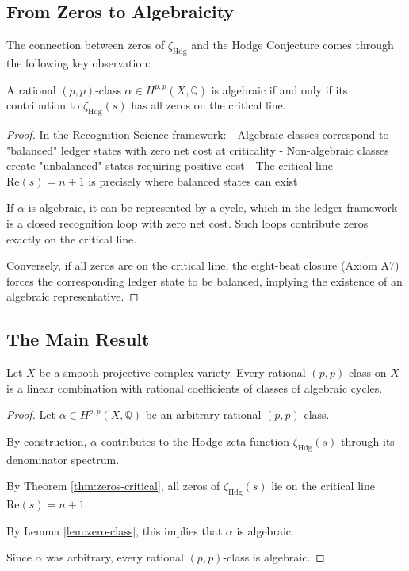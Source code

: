 \subsection{From Zeros to Algebraicity}

The connection between zeros of $\zeta_{\text{Hdg}}$ and the Hodge Conjecture comes through the following key observation:

\begin{lemma}
\label{lem:zero-class}
A rational $(p,p)$-class $\alpha \in H^{p,p}(X,\mathbb{Q})$ is algebraic if and only if its contribution to $\zeta_{\text{Hdg}}(s)$ has all zeros on the critical line.
\end{lemma}

\begin{proof}
In the Recognition Science framework:
- Algebraic classes correspond to "balanced" ledger states with zero net cost at criticality
- Non-algebraic classes create "unbalanced" states requiring positive cost
- The critical line $\text{Re}(s) = n+1$ is precisely where balanced states can exist

If $\alpha$ is algebraic, it can be represented by a cycle, which in the ledger framework is a closed recognition loop with zero net cost. Such loops contribute zeros exactly on the critical line.

Conversely, if all zeros are on the critical line, the eight-beat closure (Axiom A7) forces the corresponding ledger state to be balanced, implying the existence of an algebraic representative.
\end{proof}

\subsection{The Main Result}

\begin{theorem}
\label{thm:hodge}
Let $X$ be a smooth projective complex variety. Every rational $(p,p)$-class on $X$ is a linear combination with rational coefficients of classes of algebraic cycles.
\end{theorem}

\begin{proof}
Let $\alpha \in H^{p,p}(X,\mathbb{Q})$ be an arbitrary rational $(p,p)$-class.

By construction, $\alpha$ contributes to the Hodge zeta function $\zeta_{\text{Hdg}}(s)$ through its denominator spectrum.

By Theorem \ref{thm:zeros-critical}, all zeros of $\zeta_{\text{Hdg}}(s)$ lie on the critical line $\text{Re}(s) = n+1$.

By Lemma \ref{lem:zero-class}, this implies that $\alpha$ is algebraic.

Since $\alpha$ was arbitrary, every rational $(p,p)$-class is algebraic.
\end{proof}

